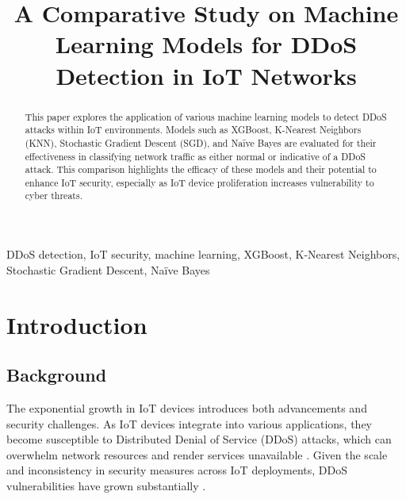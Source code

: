 \documentclass[conference]{IEEEtran}
\begin{document}
\title{A Comparative Study on Machine Learning Models for DDoS Detection in IoT Networks}

\author{
\and
{}
}

\maketitle

\begin{abstract}
This paper explores the application of various machine learning models to detect DDoS attacks within IoT environments. Models such as XGBoost, K-Nearest Neighbors (KNN), Stochastic Gradient Descent (SGD), and Naïve Bayes are evaluated for their effectiveness in classifying network traffic as either normal or indicative of a DDoS attack. This comparison highlights the efficacy of these models and their potential to enhance IoT security, especially as IoT device proliferation increases vulnerability to cyber threats.
\end{abstract}

\begin{IEEEkeywords}
DDoS detection, IoT security, machine learning, XGBoost, K-Nearest Neighbors, Stochastic Gradient Descent, Naïve Bayes
\end{IEEEkeywords}

\section{Introduction}

\subsection{Background}
The exponential growth in IoT devices introduces both advancements and security challenges. As IoT devices integrate into various applications, they become susceptible to Distributed Denial of Service (DDoS) attacks, which can overwhelm network resources and render services unavailable \cite{xu2020survey}. Given the scale and inconsistency in security measures across IoT deployments, DDoS vulnerabilities have grown substantially \cite{buczak2016survey}.
\end{document}

